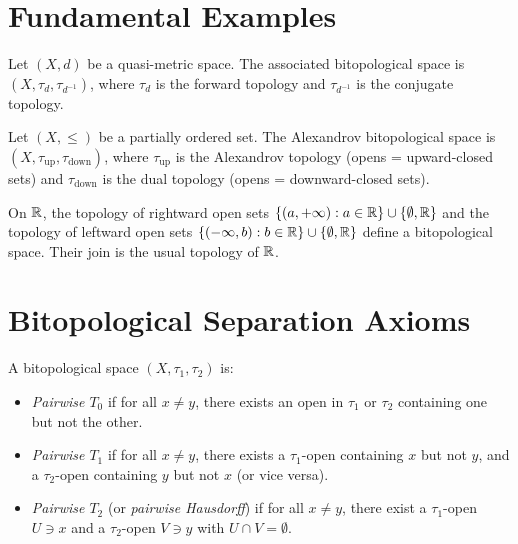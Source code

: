 \section{Fundamental Examples}

\begin{example}
Let $(X,d)$ be a quasi-metric space. The associated bitopological space is
$(X, \tau_d, \tau_{d^{-1}})$, where $\tau_d$ is the forward topology and
$\tau_{d^{-1}}$ is the conjugate topology.
\end{example}

\begin{example}
Let $(X,\leq)$ be a partially ordered set. The Alexandrov bitopological space is
$(X, \tau_{\mathrm{up}}, \tau_{\mathrm{down}})$, where $\tau_{\mathrm{up}}$ is the
Alexandrov topology (opens = upward-closed sets) and $\tau_{\mathrm{down}}$ is the dual
topology (opens = downward-closed sets).
\end{example}

\begin{example}
On $\mathbb{R}$, the topology of rightward open sets $\{(a,+\infty) : a \in \mathbb{R}\} \cup
\{\emptyset, \mathbb{R}\}$ and the topology of leftward open sets
$\{(-\infty, b) : b \in \mathbb{R}\} \cup \{\emptyset, \mathbb{R}\}$ define a bitopological space. Their
join is the usual topology of $\mathbb{R}$.
\end{example}

\section{Bitopological Separation Axioms}

\begin{definition}
A bitopological space $(X, \tau_1, \tau_2)$ is:
\begin{itemize}
  \item \emph{Pairwise $T_0$} if for all $x \neq y$, there exists an open in $\tau_1$ or
    $\tau_2$ containing one but not the other.
  \item \emph{Pairwise $T_1$} if for all $x \neq y$, there exists a $\tau_1$-open
    containing $x$ but not $y$, and a $\tau_2$-open containing $y$ but not $x$ (or
    vice versa).
  \item \emph{Pairwise $T_2$} (or \emph{pairwise Hausdorff}) if for all $x \neq y$,
    there exist a $\tau_1$-open $U \ni x$ and a $\tau_2$-open $V \ni y$ with
    $U \cap V = \emptyset$.
\end{itemize}
\end{definition}

